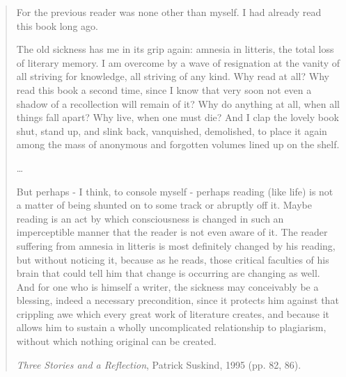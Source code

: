 %
%
%
%


\nnormalsize
\ifprintedbook
\else
\begin{quote}
For the previous reader was none other than myself. I had already
read this book long ago.

The old sickness has me in its grip again: amnesia in litteris,
the total loss of literary memory. I am overcome by a wave of
resignation at the vanity of all striving for knowledge, all
striving of any kind. Why read at all? Why read this book a second time,
since I know that very soon not even a shadow of a recollection will remain
of it? Why do anything at all, when all things fall apart?
Why live, when one must die? And I clap the lovely book shut, stand
up, and slink back, vanquished, demolished, to place it again
among the mass of anonymous and forgotten volumes lined up on the shelf.

\ldots

But perhaps - I think, to console myself - perhaps reading
(like life) is not a matter of being shunted on to some track or abruptly off
it. Maybe reading is an act by which consciousness is changed in such an
imperceptible manner that the reader is not even aware of
it. The reader suffering from amnesia in litteris is most definitely
changed by his reading, but without noticing it, because as he
reads, those critical faculties of his brain that could tell him that
change is occurring are changing as well. And for one who is himself
a writer, the sickness may conceivably be a blessing, indeed a necessary
precondition, since it protects him against that crippling awe
which every great work of literature creates, and because it allows him
to sustain a wholly uncomplicated relationship to plagiarism,
without which nothing original can be created.

{\it Three Stories and a Reflection}, Patrick Suskind, 1995 (pp. 82, 86).
\end{quote}
\fi

